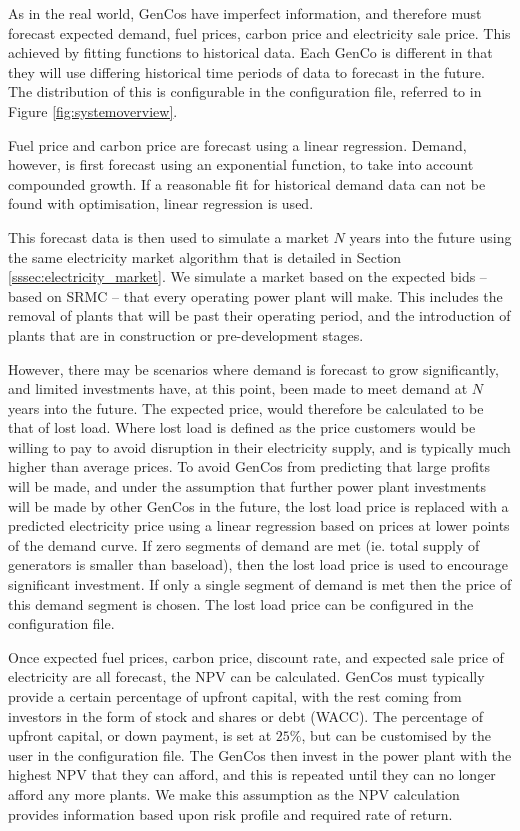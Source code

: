 As in the real world, GenCos have imperfect information, and therefore must forecast expected demand, fuel prices, carbon price and electricity sale price. This achieved by fitting functions to historical data. Each GenCo is different in that they will use differing historical time periods of data to forecast in the future. The distribution of this is configurable in the configuration file, referred to in Figure \ref{fig:systemoverview}.

Fuel price and carbon price are forecast using a linear regression. Demand, however, is first forecast using an exponential function, to take into account compounded growth. If a reasonable fit for historical demand data can not be found with optimisation, linear regression is used.

This forecast data is then used to simulate a market $N$ years into the future using the same electricity market algorithm that is detailed in Section \ref{sssec:electricity_market}. We simulate a market based on the expected bids -- based on SRMC -- that every operating power plant will make. This includes the removal of plants that will be past their operating period, and the introduction of plants that are in construction or pre-development stages. 

However, there may be scenarios where demand is forecast to grow significantly, and limited investments have, at this point, been made to meet demand at $N$ years into the future. The expected price, would therefore be calculated to be that of lost load. Where lost load is defined as the price customers would be willing to pay to avoid disruption in their electricity supply, and is typically much higher than average prices. To avoid GenCos from predicting that large profits will be made, and under the assumption that further power plant investments will be made by other GenCos in the future, the lost load price is replaced with a predicted electricity price using a linear regression based on prices at lower points of the demand curve. If zero segments of demand are met (ie. total supply of generators is smaller than baseload), then the lost load price is used to encourage significant investment. If only a single segment of demand is met then the price of this demand segment is chosen. The lost load price can be configured in the configuration file.

Once expected fuel prices, carbon price, discount rate, and expected sale price of electricity are all forecast, the NPV can be calculated. GenCos must typically provide a certain percentage of upfront capital, with the rest coming from investors in the form of stock and shares or debt (WACC). The percentage of upfront capital, or down payment, is set at $25\%$, but can be customised by the user in the configuration file. The GenCos then invest in the power plant with the highest NPV that they can afford, and this is repeated until they can no longer afford any more plants. We make this assumption as the NPV calculation provides information based upon risk profile and required rate of return.

